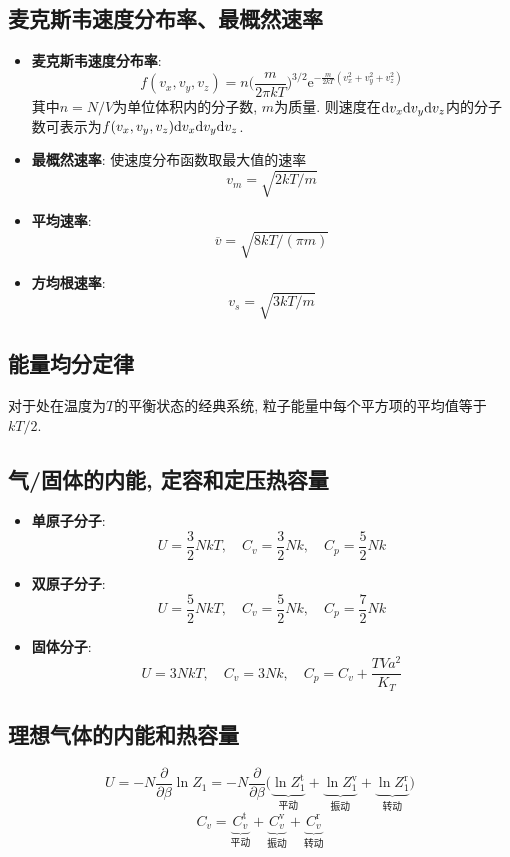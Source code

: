 \subsection{麦克斯韦速度分布率、最概然速率}
\begin{itemize}
\item\textbf{麦克斯韦速度分布率}: 
\[
f(v_{x},v_{y},v_{z})=n\bigg(\frac{m}{2\pi kT}\bigg)^{3/2}\mathrm{e}^{-\frac{m}{2kT}(v_{x}^{2}+v_{y}^{2}+v_{z}^{2})}
\]
萁中$n=N/V$为单位体积内的分子数, $m$为质量. 则速度在$\mathrm{d} v_x\mathrm{d} v_y\mathrm{d} v_z $内的分子数可表示为$f(v_x,v_y,v_z)\mathrm{d} v_x\mathrm{d} v_y\mathrm{d} v_z $.
\item\textbf{最概然速率}: 使速度分布函数取最大值的速率
\[
v_{m} = \sqrt{2kT/m}
\]
\item\textbf{平均速率}:
\[
\overline{v} = \sqrt{8kT/(\pi m)}
\]
\item\textbf{方均根速率}:
\[
v_{s} = \sqrt{3kT/m}
\]
\end{itemize}


\subsection{能量均分定律}
对于处在温度为$T$的平衡状态的经典系统, 粒子能量中每个平方项的平均值等于$kT/2$.

\subsection{气/固体的内能, 定容和定压热容量}
\begin{itemize}
\item\textbf{单原子分子}:
\[
U = \frac{3}{2}NkT,\quad
C_v = \frac{3}{2}Nk,\quad
C_p = \frac{5}{2}Nk
\]
\item\textbf{双原子分子}:
\[
U = \frac{5}{2}NkT,\quad
C_v = \frac{5}{2}Nk,\quad
C_p = \frac{7}{2}Nk
\]
\item\textbf{固体分子}:
\[
U = 3NkT,\quad
C_v = 3Nk,\quad
C_p = C_v + \frac{TVa^2}{K_T}
\]
\end{itemize}


\subsection{理想气体的内能和热容量}
\[
U = -N\frac{\partial}{\partial\beta}\ln Z_1 = 
-N\frac{\partial}{\partial\beta}\big(
\underbrace{\ln Z_1^\mathrm{t}}_{\textrm{平动}}
+\underbrace{\ln Z_1^\mathrm{v}}_{\textrm{振动}}
+\underbrace{\ln Z_1^\mathrm{r}}_{\textrm{转动}}
\big)
\]
\[
C_v = \underbrace{C_v^\mathrm{t}}_{\textrm{平动}}
+\underbrace{C_v^\mathrm{v}}_{\textrm{振动}}
+\underbrace{C_v^\mathrm{r}}_{\textrm{转动}}
\]

